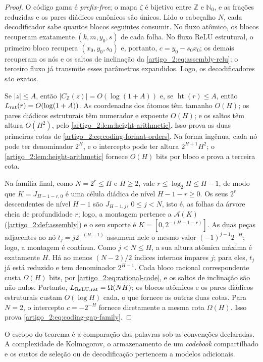 \documentclass[12pt,a4paper]{article}
\theoremstyle{preciso}
\theoremstyle{definition}
\newcommand{\Nzero}{\mathbb{N}_0}
\newcommand{\Aclass}{\mathcal{A}}
\newcommand{\height}{\operatorname{ht}}
\theoremstyle{preciso}
\theoremstyle{preciso}
\theoremstyle{preciso}
\theoremstyle{preciso}
\theoremstyle{definition}
\theoremstyle{preciso}
\theoremstyle{definition}
\theoremstyle{preciso}
\theoremstyle{preciso}
\theoremstyle{definition}
\begin{document}
\begin{proof}
O código gama é \emph{prefix-free}; o mapa $\zeta$ é bijetivo entre $\mathbb Z$ e
$\Nzero$, e as frações reduzidas e os pares diádicos canônicos são únicos. Lido o
cabeçalho $N$, cada decodificador sabe quantos blocos seguintes consumir. No
fluxo atômico, os blocos recuperam exatamente $(k,m,y_0,s)$ de cada folha. No
fluxo ReLU estrutural, o primeiro bloco recupera $(x_0,y_0,s_0)$ e, portanto,
$c=y_0-s_0x_0$; os demais recuperam os nós e os saltos de inclinação da
\cref{artigo_2:eq:assembly-relu}; o terceiro fluxo já transmite esses parâmetros
expandidos. Logo, os decodificadores são exatos.

Se $|z|\le A$, então $|C_{\mathbb Z}(z)|=O(\log(1+A))$ e, se
$\height(r)\le A$, então $L_{\rm rat}(r)=O(\log(1+A))$. As coordenadas dos
átomos têm tamanho $O(H)$; os pares diádicos estruturais têm numerador e
expoente $O(H)$; e os saltos têm altura $O(H^2)$, pelo
\cref{artigo_2:lem:height-arithmetic}. Isso prova as duas primeiras cotas de
\eqref{artigo_2:eq:coding-format-orders}. Na forma ingênua, cada nó pode ter
denominador $2^H$, e o intercepto pode ter altura $2^{H+1}H^2$; o
\cref{artigo_2:lem:height-arithmetic} fornece $O(H)$ bits por bloco e prova a terceira cota.

Na família final, como $N=2^r\le H$ e $H\ge2$, vale $r\le\log_2H\le H-1$, de
modo que $K=J_{H-1-r,0}$ é uma célula diádica de nível $H-1-r\ge0$. Os seus
$2^r$ descendentes de nível $H-1$ são $J_{H-1,j}$, $0\le j<N$, isto é, as
folhas da árvore cheia de profundidade $r$; logo, a montagem pertence a
$\Aclass(K)$ (\cref{artigo_2:def:assembly}) e o seu suporte é $K=[0,2^{-(H-1-r)}]$.
As duas peças adjacentes ao nó
$t_j=j2^{-(H-1)}$ assumem nele o mesmo valor
$(-1)^{j-1}2^{-H}$; logo, a montagem é contínua. Como $j<N\le H$, a sua altura
atômica máxima é exatamente $H$. Há ao menos $(N-2)/2$ índices internos
ímpares $j$; para eles, $t_j$ já está reduzido e tem denominador
$2^{H-1}$. Cada bloco racional correspondente custa $\Omega(H)$ bits, por
\eqref{artigo_2:eq:rational-code}, e os saltos de inclinação são não nulos. Portanto,
$L_{\rm ReLU,rat}=\Omega(NH)$; os blocos atômicos e os pares diádicos
estruturais custam $O(\log H)$ cada, o que fornece as outras duas cotas. Para $N=2$,
o intercepto $c=-2^{-H}$ fornece diretamente a mesma cota $\Omega(H)$.
Isso prova \eqref{artigo_2:eq:coding-gap-family}.
\end{proof}

O escopo do teorema é a comparação das palavras sob as convenções declaradas.
A complexidade de Kolmogorov, o armazenamento de um \emph{codebook} compartilhado e
os custos de seleção ou de decodificação pertencem a modelos adicionais.
\end{document}
